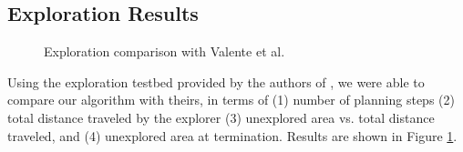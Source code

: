 \subsection{Exploration Results}
\begin{figure}
\centering
{}
\caption{Exploration comparison with Valente et al.\label{fig:valente}
}
\end{figure}

Using the exploration testbed provided by the authors of \cite{valenteTS13}, 
we were able to compare our algorithm with theirs,
in terms of (1) number of planning steps (2) total distance traveled by the explorer (3) unexplored area {vs.} total distance traveled,
and (4) unexplored area at termination.  Results are shown in Figure \ref{fig:valente}.